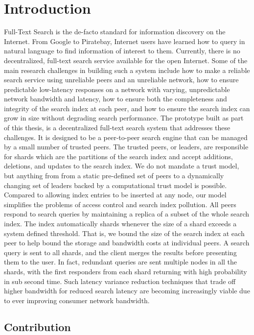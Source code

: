 \documentclass[12pt,a4paper,twoside,openright]{book}
\begin{document}
\chapter{Introduction}
\label{chap:introduction}
Full-Text Search is the de-facto standard for information discovery on the Internet. From Google to Piratebay, Internet users have learned how to query in natural language to find information of interest to them. Currently, there is no decentralized, full-text search service available for the open Internet. Some of the main research challenges in building such a system include how to make a reliable search service using unreliable peers and an unreliable network, how to ensure predictable low-latency responses on a network with varying, unpredictable network bandwidth and latency, how to ensure both the completeness and integrity of the search index at each peer, and how to ensure the search index can grow in size without degrading search performance. The prototype built as part of this thesis, is a decentralized full-text search system that addresses these challenges. It is designed to be a peer-to-peer search engine that can be managed by a small number of trusted peers. The trusted peers, or leaders, are responsible for shards which are the partitions of the search index and accept additions, deletions, and updates to the search index. We do not mandate a trust model, but anything from from a static pre-defined set of peers to a dynamically changing set of leaders backed by a computational trust model is possible. Compared to allowing index entries to be inserted at any node, our model simplifies the problems of access control and search index pollution. All peers respond to search queries by maintaining a replica of a subset of the whole search index. The index automatically shards whenever the size of a shard exceeds a system defined threshold. That is, we bound the size of the search index at each peer to help bound the storage and bandwidth costs at individual peers. A search query is sent to all shards, and the client merges the results before presenting them to the user. In fact, redundant queries are sent multiple nodes in all the shards, with the first responders from each shard returning with high probability in sub second time. Such latency variance reduction techniques that trade off higher bandwidth for reduced search latency are becoming increasingly viable due to ever improving consumer network bandwidth.


\section{Contribution}
\label{sec: contribution}
\end{document}
